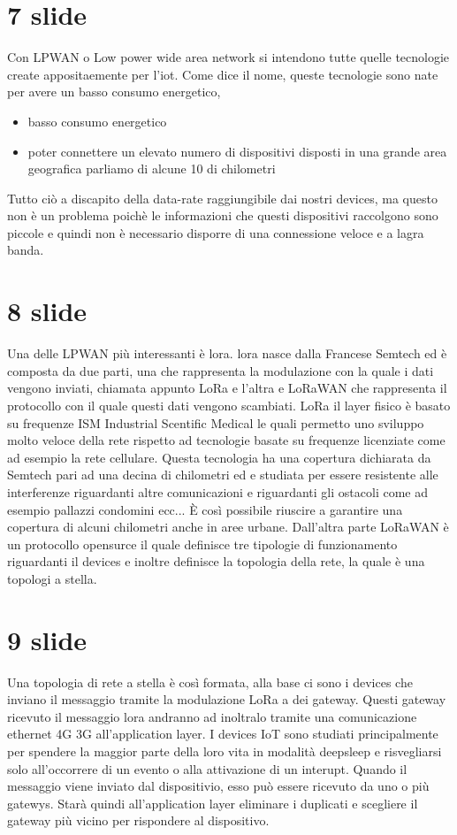 \documentclass[12pt]{article}
\begin{document}
\section{7 slide}
Con LPWAN o Low power wide area network si intendono tutte quelle tecnologie
create appositaemente per l'iot. Come dice il nome, queste tecnologie sono nate
per avere un basso consumo energetico, 
\begin{itemize}
	\item basso consumo energetico
	\item poter connettere un elevato numero di dispositivi disposti in una
		grande area geografica parliamo di alcune 10 di chilometri
\end{itemize}
Tutto ciò a discapito della data-rate raggiungibile dai nostri devices, ma
questo non è un problema poichè le informazioni che questi dispositivi
raccolgono sono piccole e quindi non è necessario disporre di una connessione
veloce e a lagra banda.
\section{8 slide}
Una delle LPWAN più interessanti è lora. lora nasce dalla Francese Semtech ed è
composta da due parti, una che rappresenta la modulazione con la quale i dati
vengono inviati, chiamata appunto LoRa e l'altra e LoRaWAN che rappresenta il
protocollo con il quale questi dati vengono scambiati. LoRa il layer fisico è
basato su frequenze ISM Industrial Scentific Medical le quali permetto uno
sviluppo molto veloce della rete rispetto ad tecnologie basate su frequenze
licenziate come ad esempio la rete cellulare. Questa tecnologia ha una copertura 
dichiarata da Semtech pari ad una decina di chilometri ed e studiata per essere 
resistente alle interferenze riguardanti altre comunicazioni e riguardanti gli
ostacoli come ad esempio pallazzi condomini ecc...  È così possibile riuscire a
garantire una copertura di alcuni chilometri anche in aree urbane.
Dall'altra parte LoRaWAN è un protocollo opensurce il quale definisce tre
tipologie di funzionamento riguardanti il devices e inoltre definisce la
topologia della rete, la quale è una topologi a stella.
\section{9 slide}
Una topologia di rete a stella è così formata, alla base ci sono i devices che
inviano il messaggio tramite la modulazione LoRa a dei gateway. Questi gateway
ricevuto il messaggio lora andranno ad inoltralo tramite una comunicazione
ethernet 4G 3G all'application layer. I devices IoT sono studiati principalmente
per spendere la maggior parte della loro vita in modalità deepsleep e risvegliarsi solo
all'occorrere di un evento o alla attivazione di un interupt.
Quando il messaggio viene inviato dal dispositivio, esso può essere ricevuto da
uno o più gatewys. Starà quindi all'application layer eliminare i duplicati e
scegliere il gateway più vicino per rispondere al dispositivo.
\end{document}
